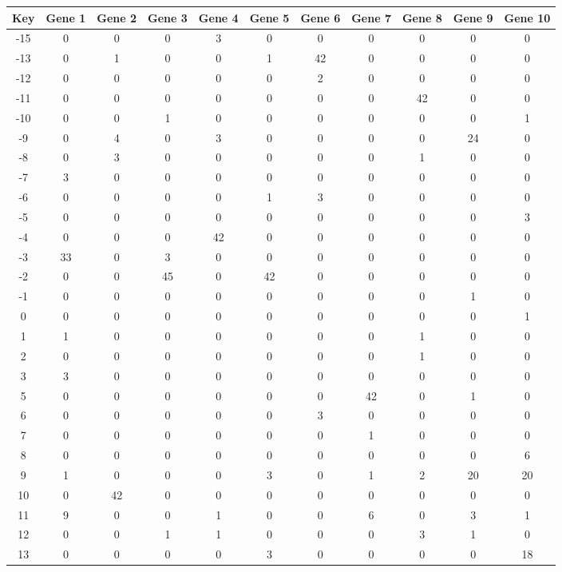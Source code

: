 \begin{tabular}{|c|c|c|c|c|c|c|c|c|c|c|}
\hline
Key & Gene 1 & Gene 2 & Gene 3 & Gene 4 & Gene 5 & Gene 6 & Gene 7 & Gene 8 & Gene 9 & Gene 10 \\
\hline
-15 & 0 & 0 & 0 & 3 & 0 & 0 & 0 & 0 & 0 & 0 \\
-13 & 0 & 1 & 0 & 0 & 1 & 42 & 0 & 0 & 0 & 0 \\
-12 & 0 & 0 & 0 & 0 & 0 & 2 & 0 & 0 & 0 & 0 \\
-11 & 0 & 0 & 0 & 0 & 0 & 0 & 0 & 42 & 0 & 0 \\
-10 & 0 & 0 & 1 & 0 & 0 & 0 & 0 & 0 & 0 & 1 \\
-9 & 0 & 4 & 0 & 3 & 0 & 0 & 0 & 0 & 24 & 0 \\
-8 & 0 & 3 & 0 & 0 & 0 & 0 & 0 & 1 & 0 & 0 \\
-7 & 3 & 0 & 0 & 0 & 0 & 0 & 0 & 0 & 0 & 0 \\
-6 & 0 & 0 & 0 & 0 & 1 & 3 & 0 & 0 & 0 & 0 \\
-5 & 0 & 0 & 0 & 0 & 0 & 0 & 0 & 0 & 0 & 3 \\
-4 & 0 & 0 & 0 & 42 & 0 & 0 & 0 & 0 & 0 & 0 \\
-3 & 33 & 0 & 3 & 0 & 0 & 0 & 0 & 0 & 0 & 0 \\
-2 & 0 & 0 & 45 & 0 & 42 & 0 & 0 & 0 & 0 & 0 \\
-1 & 0 & 0 & 0 & 0 & 0 & 0 & 0 & 0 & 1 & 0 \\
0 & 0 & 0 & 0 & 0 & 0 & 0 & 0 & 0 & 0 & 1 \\
1 & 1 & 0 & 0 & 0 & 0 & 0 & 0 & 1 & 0 & 0 \\
2 & 0 & 0 & 0 & 0 & 0 & 0 & 0 & 1 & 0 & 0 \\
3 & 3 & 0 & 0 & 0 & 0 & 0 & 0 & 0 & 0 & 0 \\
5 & 0 & 0 & 0 & 0 & 0 & 0 & 42 & 0 & 1 & 0 \\
6 & 0 & 0 & 0 & 0 & 0 & 3 & 0 & 0 & 0 & 0 \\
7 & 0 & 0 & 0 & 0 & 0 & 0 & 1 & 0 & 0 & 0 \\
8 & 0 & 0 & 0 & 0 & 0 & 0 & 0 & 0 & 0 & 6 \\
9 & 1 & 0 & 0 & 0 & 3 & 0 & 1 & 2 & 20 & 20 \\
10 & 0 & 42 & 0 & 0 & 0 & 0 & 0 & 0 & 0 & 0 \\
11 & 9 & 0 & 0 & 1 & 0 & 0 & 6 & 0 & 3 & 1 \\
12 & 0 & 0 & 1 & 1 & 0 & 0 & 0 & 3 & 1 & 0 \\
13 & 0 & 0 & 0 & 0 & 3 & 0 & 0 & 0 & 0 & 18 \\
\hline
\end{tabular}
